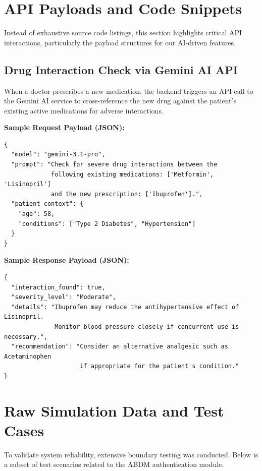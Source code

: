 \section{API Payloads and Code Snippets}
Instead of exhaustive source code listings, this section highlights critical API interactions, particularly the payload structures for our AI-driven features.

\subsection{Drug Interaction Check via Gemini AI API}
When a doctor prescribes a new medication, the backend triggers an API call to the Gemini AI service to cross-reference the new drug against the patient's existing active medications for adverse interactions.

\textbf{Sample Request Payload (JSON):}
\begin{verbatim}
{
  "model": "gemini-3.1-pro",
  "prompt": "Check for severe drug interactions between the 
             following existing medications: ['Metformin', 'Lisinopril'] 
             and the new prescription: ['Ibuprofen'].",
  "patient_context": {
    "age": 58,
    "conditions": ["Type 2 Diabetes", "Hypertension"]
  }
}
\end{verbatim}

\textbf{Sample Response Payload (JSON):}
\begin{verbatim}
{
  "interaction_found": true,
  "severity_level": "Moderate",
  "details": "Ibuprofen may reduce the antihypertensive effect of Lisinopril. 
              Monitor blood pressure closely if concurrent use is necessary.",
  "recommendation": "Consider an alternative analgesic such as Acetaminophen 
                     if appropriate for the patient's condition."
}
\end{verbatim}

\section{Raw Simulation Data and Test Cases}
To validate system reliability, extensive boundary testing was conducted. Below is a subset of test scenarios related to the ABDM authentication module.

